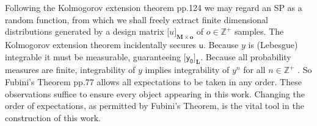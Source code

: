 \documentclass[preprint,12pt]{elsarticle}
\newcommand*{\x}{\times}
\newcommand*{\mi}[1]{\mathbf{#1}}
\newcommand*{\st}[1]{\mathbb{#1}}
\newcommand*{\rv}[1]{\mathsf{#1}}
\newcommand*{\tte}[2][]{\lbrack{#2}\rbrack_{#1}}
\begin{document}
    Following the Kolmogorov extension theorem \cite{Rogers.Williams2000} pp.124 we may regard an SP as a random function, from which we shall freely extract finite dimensional distributions generated by a design matrix $\tte[\mi{M\x o}]{u}$ of $o \in \st{Z}^{+}$ samples.
    The Kolmogorov extension theorem incidentally secures $\rv{u}$. 
    Because $y$ is (Lebesgue) integrable it must be measurable, guaranteeing $\tte[\mi{L}]{\rv{y_0}}$.
    Because all probability measures are finite, integrability of $y$ implies integrability of $y^n$ for all $n \in \st{Z}^{+}$ \cite{Villani1985}. 
    So Fubini's Theorem \cite{Williams1991} pp.77 allows all expectations to be taken in any order. These observations suffice to ensure every object appearing in this work. Changing the order of expectations, as permitted by Fubini's Theorem, is the vital tool in the construction of this work. 
\end{document}
